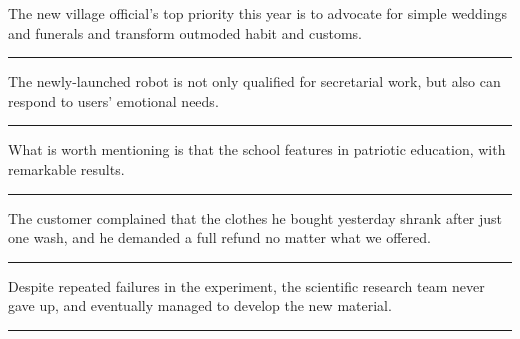 \documentclass[11pt,a4paper]{article}
\newcommand{\num}[1]{\makebox[1.9em][r]{#1.}\hspace{0.3em}}
\newcommand{\wline}{\noindent\rule{\linewidth}{0.4pt}}
\begin{document}
\begin{minipage}{\linewidth}

\num{27}The new village official’s top priority this year is to advocate for simple weddings and funerals and transform outmoded habit and customs.

\vspace{0.25em}

\wline

\end{minipage}

\begin{minipage}{\linewidth}

\num{28}The newly-launched robot is not only qualified for secretarial work, but also can respond to users’ emotional needs.

\vspace{0.25em}

\wline

\end{minipage}

\vspace{0.35em}\vspace{0.15em}

\begin{minipage}{\linewidth}

\num{29}What is worth mentioning is that the school features in patriotic education, with remarkable results.

\vspace{0.25em}

\wline

\end{minipage}

\begin{minipage}{\linewidth}

\num{30}The customer complained that the clothes he bought yesterday shrank after just one wash, and he demanded a full refund no matter what we offered.

\vspace{0.25em}

\wline

\end{minipage}

\begin{minipage}{\linewidth}

\num{31}Despite repeated failures in the experiment, the scientific research team never gave up, and eventually managed to develop the new material.

\vspace{0.25em}

\wline

\end{minipage}
\end{document}
